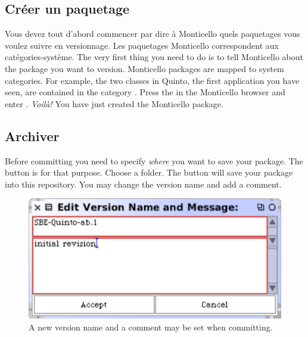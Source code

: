 \documentclass[a4paper,10pt,twoside]{book}
\begin{document}
\subsection{Cr\'eer un paquetage}

Vous devez tout d'abord commencer par dire \`a Monticello quels
paquetages vous voulez suivre en versionnage. Les paquetages Monticello
correspondent aux cat\'egories-syst\`eme.
The very first thing you need to do is to tell Monticello about the package you want to version. Monticello packages are mapped to system categories. For example, the two classes in Quinto, the first application you have seen, are contained in the category . Press the  in the Monticello browser and enter . \emph{Voil\`a!} You have just created the  Monticello package. 

\subsection{Archiver} %

Before committing you need to specify \emph{where} you want to save your package. The  button is for that purpose. Choose a folder.   The  button will save your package into this repository. You may change the version name and add a comment. 

\begin{figure}[ht]\centering
	\includegraphics[width=.55\linewidth]{saving.png}
	\caption{A new version name and a comment may be set when committing.}
\end{figure}
\end{document}
